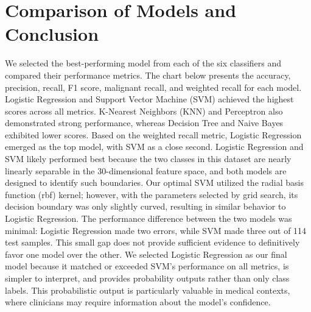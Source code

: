 \documentclass[paper=letter, fontsize=11pt]{scrartcl} %
\numberwithin{equation}{section}
\numberwithin{figure}{section}
\numberwithin{table}{section}
\begin{document}
\section{Comparison of Models and Conclusion}
We selected the best-performing model from each of the six classifiers and compared their performance metrics.
The chart below presents the accuracy, precision, recall, F1 score, malignant recall, and weighted recall for
each model. Logistic Regression and Support Vector Machine (SVM) achieved the highest scores across all metrics.
K-Nearest Neighbors (KNN) and Perceptron also demonstrated strong performance, whereas Decision Tree and Naive Bayes
exhibited lower scores. Based on the weighted recall metric, Logistic Regression emerged as the top model, with
SVM as a close second. \newline
Logistic Regression and SVM likely performed best because the two classes in this dataset are nearly linearly
separable in the 30-dimensional feature space, and both models are designed to identify such boundaries. Our optimal SVM
utilized the radial basis function (rbf) kernel; however, with the parameters selected by grid search, its decision
boundary was only slightly curved, resulting in similar behavior to Logistic Regression. The performance difference
between the two models was minimal: Logistic Regression made two errors, while SVM made three out of 114 test samples.
This small gap does not provide sufficient evidence to definitively favor one model over the other. We selected Logistic
Regression as our final model because it matched or exceeded SVM's performance on all metrics, is simpler to interpret,
and provides probability outputs rather than only class labels. This probabilistic output is particularly valuable in medical
contexts, where clinicians may require information about the model's confidence.
\end{document}
